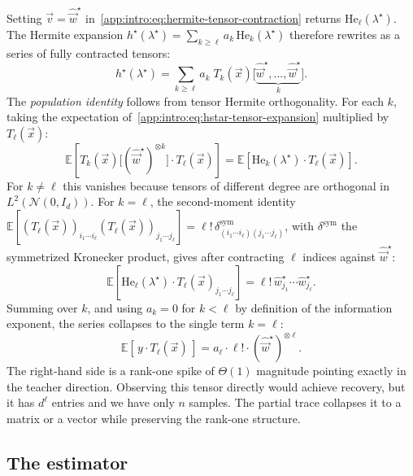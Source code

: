 Setting \(\vec{v} = \hat{\vec{w}}^\star\) in~\eqref{app:intro:eq:hermite-tensor-contraction} returns \(\mathrm{He}_\ell(\lambda^\star)\). The Hermite expansion \(h^\star(\lambda^\star) = \sum_{k \geq \ell} a_k\,\mathrm{He}_k(\lambda^\star)\) therefore rewrites as a series of fully contracted tensors:
\begin{equation}\label{app:intro:eq:hstar-tensor-expansion}
    h^\star(\lambda^\star)
    = \sum_{k \geq \ell} a_k\;T_k(\vec{x})\bigl[\underbrace{\hat{\vec{w}}^\star,\ldots,\hat{\vec{w}}^\star}_k\bigr].
\end{equation}
The \emph{population identity} follows from tensor Hermite orthogonality. For each \(k\), taking the expectation of~\eqref{app:intro:eq:hstar-tensor-expansion} multiplied by \(T_\ell(\vec{x})\):
\[
    \mathbb{E}\!\left[T_k(\vec{x})\bigl[(\hat{\vec{w}}^\star)^{\otimes k}\bigr] \cdot T_\ell(\vec{x})\right]
    = \mathbb{E}\!\left[\mathrm{He}_k(\lambda^\star)\cdot T_\ell(\vec{x})\right].
\]
For \(k \neq \ell\) this vanishes because tensors of different degree are orthogonal in \(L^2(\mathcal{N}(0,I_d))\). For \(k = \ell\), the second-moment identity
\(\mathbb{E}[(T_\ell(\vec{x}))_{i_1\cdots i_\ell}(T_\ell(\vec{x}))_{j_1\cdots j_\ell}] = \ell!\,\delta^{\mathrm{sym}}_{(i_1\cdots i_\ell)(j_1\cdots j_\ell)}\),
with \(\delta^{\mathrm{sym}}\) the symmetrized Kronecker product, gives after contracting \(\ell\) indices against \(\hat{\vec{w}}^\star\):
\[
    \mathbb{E}\!\left[\mathrm{He}_\ell(\lambda^\star)\cdot T_\ell(\vec{x})_{j_1\cdots j_\ell}\right]
    = \ell!\,\hat{w}^\star_{j_1}\cdots\hat{w}^\star_{j_\ell}.
\]
Summing over \(k\), and using \(a_k = 0\) for \(k < \ell\) by definition of the information exponent, the series collapses to the single term \(k = \ell\):
\begin{equation}\label{app:intro:eq:pop-identity}
    \mathbb{E}\!\left[\,y\cdot T_\ell(\vec{x})\,\right] = a_\ell\cdot\ell!\cdot(\hat{\vec{w}}^\star)^{\otimes \ell}.
\end{equation}
The right-hand side is a rank-one spike of \(\Theta(1)\) magnitude pointing exactly in the teacher direction. Observing this tensor directly would achieve recovery, but it has \(d^\ell\) entries and we have only \(n\) samples. The partial trace collapses it to a matrix or a vector while preserving the rank-one structure.

\subsection{The estimator}

